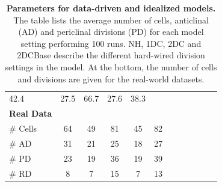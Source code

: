 \documentclass[11pt,a4paper, final]{article}
\begin{document}
\begin{table}
\begin{tabular}{@{}lccccccccccc@{}}
42.4 & 27.5 & 66.7 & 27.6 & 38.3\\
\textbf{Real Data}\\
$\#$ Cells & 64 & 49 & 81 & 45 & 82 &&
& & & &\\
$\#$ AD & 31 & 21 & 25 & 18 & 27 &&
& & & &\\
$\#$ PD & 23 & 19 & 36 & 19 & 39 &&
& & & &\\
$\#$ RD & 8 & 7 & 15 & 7 & 13 &&
& & & &\\
\bottomrule
\end{tabular}
	\caption[Parameters for data-driven and idealized models.]{\textbf{Parameters for data-driven and idealized models.} The table lists the average number of cells, anticlinal (AD) and periclinal divisions (PD) for each model setting performing 100 runs. NH, 1DC, 2DC and 2DCBase describe the different hard-wired division settings in the model. At the bottom, the number of cells and divisions are given for the real-world datasets.
	}
	\label{tab:modelParameters}
\end{table}

\newpage
\end{document}
